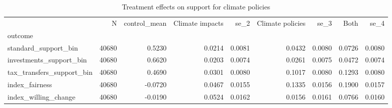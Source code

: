 \begin{table}
\caption{Treatment effects on support for climate policies}
\label{tab:a15_country_fe}
\begin{tabular}{lrrrrrrrr}
\toprule
 & N & control_mean & Climate impacts & se_2 & Climate policies & se_3 & Both & se_4 \\
outcome &  &  &  &  &  &  &  &  \\
\midrule
standard_support_bin & 40680 & 0.5230 & 0.0214 & 0.0081 & 0.0432 & 0.0080 & 0.0726 & 0.0080 \\
investments_support_bin & 40680 & 0.6620 & 0.0203 & 0.0074 & 0.0261 & 0.0075 & 0.0472 & 0.0074 \\
tax_transfers_support_bin & 40680 & 0.4690 & 0.0301 & 0.0080 & 0.1017 & 0.0080 & 0.1293 & 0.0080 \\
index_fairness & 40680 & -0.0720 & 0.0467 & 0.0155 & 0.1335 & 0.0156 & 0.1900 & 0.0157 \\
index_willing_change & 40680 & -0.0190 & 0.0524 & 0.0162 & 0.0156 & 0.0161 & 0.0766 & 0.0160 \\
\bottomrule
\end{tabular}
\end{table}
